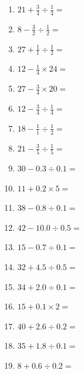 \documentclass[12pt]{article}
\begin{document}
\begin{enumerate}
\item \large $ 21 + \frac{3}{4} \div \frac{1}{4} = $ \vspace{1.6cm}
\item \large $ 8 - \frac{3}{2} \div \frac{1}{2} = $ \vspace{1.6cm}
\item \large $ 27 + \frac{1}{1} \div \frac{1}{2} = $ \vspace{1.6cm}
\newpage
\item \large $ 12 - \frac{1}{4} \times 24 = $ \vspace{1.6cm}
\item \large $ 27 - \frac{3}{4} \times 20 = $ \vspace{1.6cm}
\item \large $ 12 - \frac{3}{4} \div \frac{1}{4} = $ \vspace{1.6cm}
\item \large $ 18 - \frac{1}{1} \div \frac{1}{2} = $ \vspace{1.6cm}
\item \large $ 21 - \frac{3}{5} \div \frac{1}{5} = $ \vspace{1.6cm}
\item \large $ 30 - 0.3 \div 0.1 = $ \vspace{1.6cm}
\item \large $ 11 + 0.2 \times 5 = $ \vspace{1.6cm}
\item \large $ 38 - 0.8 \div 0.1 = $ \vspace{1.6cm}
\item \large $ 42 - 10.0 \div 0.5 = $ \vspace{1.6cm}
\item \large $ 15 - 0.7 \div 0.1 = $ \vspace{1.6cm}
\newpage
\item \large $ 32 + 4.5 \div 0.5 = $ \vspace{1.6cm}
\item \large $ 34 + 2.0 \div 0.1 = $ \vspace{1.6cm}
\item \large $ 15 + 0.1 \times 2 = $ \vspace{1.6cm}
\item \large $ 40 + 2.6 \div 0.2 = $ \vspace{1.6cm}
\item \large $ 35 + 1.8 \div 0.1 = $ \vspace{1.6cm}
\item \large $ 8 + 0.6 \div 0.2 = $ \vspace{1.6cm}

\end{enumerate}
\end{document}
